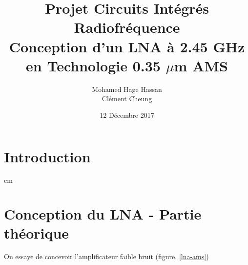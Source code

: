 \documentclass[a4paper]{article}
\begin{document}
\newcommand\textstyleEmphasis[1]{\textit{#1}}
\renewcommand{\contentsname}{Table des mati\`eres}
\renewcommand\refname{R\'ef\'erences}

\renewcommand{\abstractname}{Pr\'eambule}
\title{\textbf{Projet Circuits Int\'egr\'es Radiofr\'equence \\ Conception d'un LNA \`a 2.45 GHz \\ en Technologie 0.35 $\mu$m AMS}}
\author{Mohamed Hage Hassan \\ Cl\'ement Cheung}
\date{12 D\'ecembre 2017}
\maketitle
\thispagestyle{empty}

\tableofcontents
\clearpage

\section*{Introduction}

 cm

\section{Conception du LNA - Partie th\'eorique}
On essaye de concevoir l'amplificateur faible bruit (figure. \ref{lna-ams})
\end{document}
